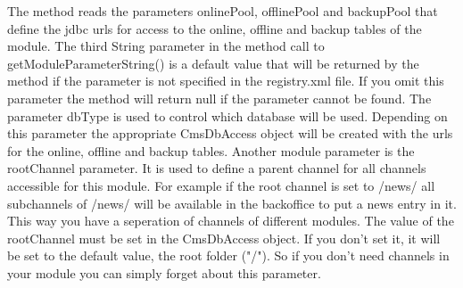 The method reads the parameters {\name onlinePool}, {\name offlinePool} and {\name backupPool}
that define the jdbc urls for access to the online, offline and backup tables of the module.
The third String parameter in the method call to {\meth getModuleParameterString()} is a default
value that will be returned by the method if the parameter is not specified in the {\name registry.xml} 
file. If you omit this parameter the method will return null if the parameter cannot be found.
The parameter {\name dbType} is used to control which database will be used. Depending on this
parameter the appropriate CmsDbAccess object will be created with the urls for the online, offline 
and backup tables. Another module parameter is the {\name rootChannel} parameter. It is used to
define a parent channel for all channels accessible for this module. For example if the root channel
is set to /news/ all subchannels of /news/ will be available in the backoffice to put a news entry
in it. This way you have a seperation of channels of different modules. The value of the {\name rootChannel}
must be set in the {\name CmsDbAccess} object. 
If you don't set it, it will be set to the default value, the root folder ("/"). So if you don't need channels
in your module you can simply forget about this parameter.
 
